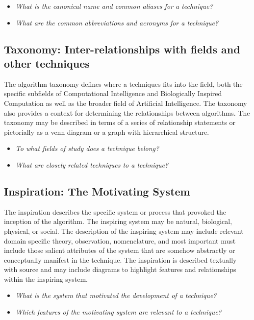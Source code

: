 \documentclass[a4paper, 11pt]{article}
\begin{document}
\begin{itemize}
	\item \emph{What is the canonical name and common aliases for a technique?}
	\item \emph{What are the common abbreviations and acronyms for a technique?}
\end{itemize}

\subsection{Taxonomy: Inter-relationships with fields and other techniques}
The algorithm taxonomy defines where a techniques fits into the field, both the specific subfields of Computational Intelligence and Biologically Inspired Computation as well as the broader field of Artificial Intelligence. The taxonomy also provides a context for determining the relationships between algorithms. The taxonomy may be described in terms of a series of relationship statements or pictorially as a venn diagram or a graph with hierarchical structure.

\begin{itemize}
	\item \emph{To what fields of study does a technique belong?}
	\item \emph{What are closely related techniques to a technique?}
\end{itemize}

\subsection{Inspiration: The Motivating System}
The inspiration describes the specific system or process that provoked the inception of the algorithm. The inspiring system may be natural, biological, physical, or social. The description of the inspiring system may include relevant domain specific theory, observation, nomenclature, and most important must include those salient attributes of the system that are somehow abstractly or conceptually manifest in the technique. The inspiration is described textually with source and may include diagrams to highlight features and relationships within the inspiring system. 

\begin{itemize}
	\item \emph{What is the system that motivated the development of a technique?}
	\item \emph{Which features of the motivating system are relevant to a technique?}
\end{itemize}
\end{document}
